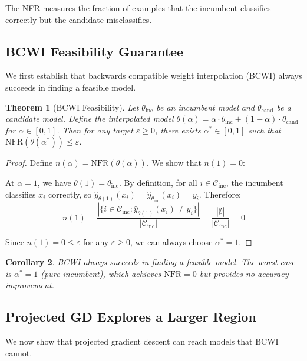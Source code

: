 \documentclass[12pt, letterpaper]{article}
\newtheorem{theorem}{Theorem}[section]
\newtheorem{corollary}[theorem]{Corollary}
\theoremstyle{remark}
\begin{document}
The NFR measures the fraction of examples that the incumbent classifies correctly but the candidate misclassifies.

\subsection{BCWI Feasibility Guarantee}

We first establish that backwards compatible weight interpolation (BCWI) always succeeds in finding a feasible model.

\begin{theorem}[BCWI Feasibility]\label{thm:bcwi-feasibility}
Let $\theta_{\mathrm{inc}}$ be an incumbent model and $\theta_{\mathrm{cand}}$ be a candidate model. Define the interpolated model $\theta(\alpha) = \alpha \cdot \theta_{\mathrm{inc}} + (1-\alpha) \cdot \theta_{\mathrm{cand}}$ for $\alpha \in [0,1]$. Then for any target $\varepsilon \geq 0$, there exists $\alpha^* \in [0,1]$ such that $\mathrm{NFR}(\theta(\alpha^*)) \leq \varepsilon$.
\end{theorem}

\begin{proof}
Define $n(\alpha) = \mathrm{NFR}(\theta(\alpha))$. We show that $n(1) = 0$:

At $\alpha = 1$, we have $\theta(1) = \theta_{\mathrm{inc}}$. By definition, for all $i \in \mathcal{C}_{\mathrm{inc}}$, the incumbent classifies $x_i$ correctly, so $\hat{y}_{\theta(1)}(x_i) = \hat{y}_{\theta_{\mathrm{inc}}}(x_i) = y_i$. Therefore:
\[
n(1) = \frac{|\{i \in \mathcal{C}_{\mathrm{inc}} : \hat{y}_{\theta(1)}(x_i) \neq y_i\}|}{|\mathcal{C}_{\mathrm{inc}}|} = \frac{|\emptyset|}{|\mathcal{C}_{\mathrm{inc}}|} = 0
\]

Since $n(1) = 0 \leq \varepsilon$ for any $\varepsilon \geq 0$, we can always choose $\alpha^* = 1$.
\end{proof}

\begin{corollary}
BCWI always succeeds in finding a feasible model. The worst case is $\alpha^* = 1$ (pure incumbent), which achieves $\mathrm{NFR} = 0$ but provides no accuracy improvement.
\end{corollary}

\subsection{Projected GD Explores a Larger Region}

We now show that projected gradient descent can reach models that BCWI cannot.
\end{document}

